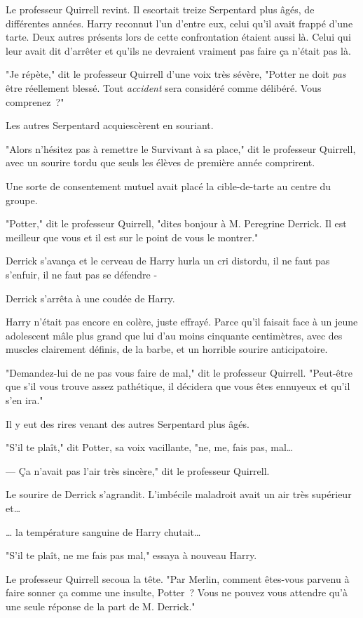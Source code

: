 Le professeur Quirrell revint. Il escortait treize Serpentard plus âgés, de différentes années. Harry reconnut l'un d'entre eux, celui qu'il avait frappé d'une tarte. Deux autres présents lors de cette confrontation étaient aussi là. Celui qui leur avait dit d'arrêter et qu'ils ne devraient vraiment pas faire ça n'était pas là.

"Je répète," dit le professeur Quirrell d'une voix très sévère, "Potter ne doit \emph{pas} être réellement blessé. Tout \emph{accident} sera considéré comme délibéré. Vous comprenez~?"

Les autres Serpentard acquiescèrent en souriant.

"Alors n'hésitez pas à remettre le Survivant à sa place," dit le professeur Quirrell, avec un sourire tordu que seuls les élèves de première année comprirent.

Une sorte de consentement mutuel avait placé la cible-de-tarte au centre du groupe.

"Potter," dit le professeur Quirrell, "dites bonjour à M. Peregrine Derrick. Il est meilleur que vous et il est sur le point de vous le montrer."

Derrick s'avança et le cerveau de Harry hurla un cri distordu, il ne faut pas s'enfuir, il ne faut pas se défendre -

Derrick s'arrêta à une coudée de Harry.

Harry n'était pas encore en colère, juste effrayé. Parce qu'il faisait face à un jeune adolescent mâle plus grand que lui d'au moins cinquante centimètres, avec des muscles clairement définis, de la barbe, et un horrible sourire anticipatoire.

"Demandez-lui de ne pas vous faire de mal," dit le professeur Quirrell. "Peut-être que s'il vous trouve assez pathétique, il décidera que vous êtes ennuyeux et qu'il s'en ira."

Il y eut des rires venant des autres Serpentard plus âgés.

"S'il te plaît," dit Potter, sa voix vacillante, "ne, me, fais pas, mal…

--- Ça n'avait pas l'air très sincère," dit le professeur Quirrell.

Le sourire de Derrick s'agrandit. L'imbécile maladroit avait un air très supérieur et…

… la température sanguine de Harry chutait…

"S'il te plaît, ne me fais pas mal," essaya à nouveau Harry.

Le professeur Quirrell secoua la tête. "Par Merlin, comment êtes-vous parvenu à faire sonner ça comme une insulte, Potter~? Vous ne pouvez vous attendre qu'à une seule réponse de la part de M. Derrick."

